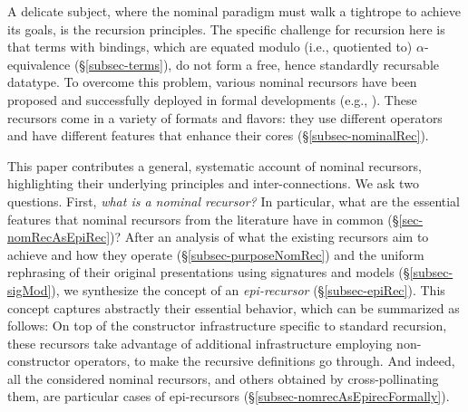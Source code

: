 A %
delicate subject, where the nominal paradigm must walk a tightrope to achieve its goals, is 
the recursion principles. 
%
The specific challenge for recursion here is 
that terms with bindings, 
which are equated modulo (i.e., quotiented to)  $\alpha$-equivalence 
(\S\ref{subsec-terms}),  
do not form a free, hence standardly recursable datatype. 
%
To overcome this problem, various nominal recursors have been proposed and successfully deployed in formal developments (e.g.,  \cite{DBLP:conf/lics/GabbayP99,pitts-AlphaStructural,primrecFOAS-Norrish04,urbanNominalRec,DBLP:conf/icfp/PopescuG11}). 
These recursors come in a variety of formats and flavors: %
they use different operators and have different features that enhance their cores  (\S\ref{subsec-nominalRec}).  
%

This paper contributes a general, systematic account of nominal recursors, 
highlighting their underlying principles and %
inter-connections. 
%
We ask two questions. First,  
\emph{what is a nominal recursor?}  
In particular, what are the essential features that %
nominal recursors from the literature have in common (\S\ref{sec-nomRecAsEpiRec})?  
  After an %
  analysis of what the existing recursors aim to achieve and 
  how they operate 
  (\S\ref{subsec-purposeNomRec}) 
and %
the uniform rephrasing of their original presentations  
using signatures and models (\S\ref{subsec-sigMod}),  
we synthesize the concept of an \emph{epi-recursor} (\S\ref{subsec-epiRec}). This concept captures abstractly 
their essential behavior, which can be summarized as follows: On top of the constructor %
infrastructure specific to standard recursion, these recursors take advantage of additional infrastructure employing non-constructor operators, to make the recursive definitions go through. And indeed, all the considered nominal recursors, and others obtained by cross-pollinating them, are particular cases of epi-recursors  (\S\ref{subsec-nomrecAsEpirecFormally}).  

